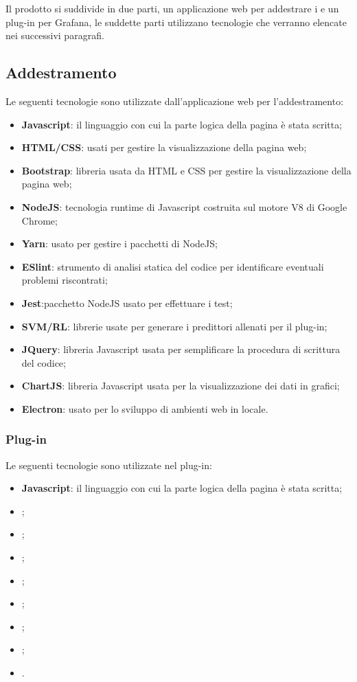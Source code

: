 \documentclass[../manuale-sviluppatore.tex]{subfiles}
\begin{document}
Il prodotto si suddivide in due parti, un applicazione web per addestrare i  e un plug-in per Grafana, le suddette parti utilizzano tecnologie che verranno elencate nei successivi paragrafi.

\subsection{Addestramento}%
\label{subs:addestramento}
Le seguenti tecnologie sono utilizzate dall'applicazione web per l'addestramento:
\begin{itemize}
  \item \textbf{Javascript}: il linguaggio con cui la parte logica della pagina è stata scritta;
  \item \textbf{HTML/CSS}: usati per gestire la visualizzazione della pagina web;
  \item \textbf{Bootstrap}: libreria usata da HTML e CSS per gestire la visualizzazione della pagina web;
  \item \textbf{NodeJS}: tecnologia runtime di Javascript costruita sul motore V8 di Google Chrome;
  \item \textbf{Yarn}: usato per gestire i pacchetti di NodeJS;
  \item \textbf{ESlint}: strumento di analisi statica del codice per identificare eventuali problemi riscontrati;
  \item \textbf{Jest}:pacchetto NodeJS usato per effettuare i test;
  \item \textbf{SVM/RL}: librerie usate per generare i predittori allenati per il plug-in;
  \item \textbf{JQuery}: libreria Javascript usata per semplificare la procedura di scrittura del codice;
  \item \textbf{ChartJS}: libreria Javascript usata per la visualizzazione dei dati in grafici;
  \item \textbf{Electron}: usato per lo sviluppo di ambienti web in locale.
\end{itemize}

\subsubsection{Plug-in}%
\label{sssec:plug_in}
Le seguenti tecnologie sono utilizzate nel plug-in:
\begin{itemize}
  \item \textbf{Javascript}: il linguaggio con cui la parte logica della pagina è stata scritta;
  \item \textbf{};
  \item \textbf{};
  \item \textbf{};
  \item \textbf{};
  \item \textbf{};
  \item \textbf{};
  \item \textbf{};
  \item \textbf{}.
\end{itemize}
\end{document}
